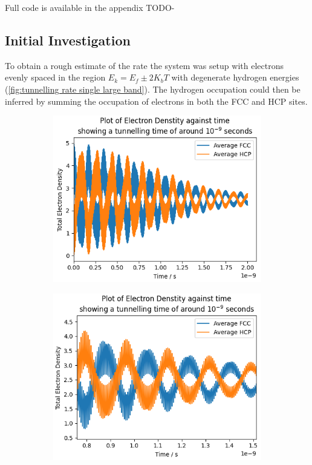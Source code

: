 Full code is available in the appendix TODO-

\subsection{Initial Investigation}
To obtain a rough estimate of
the rate the system was setup
with electrons evenly spaced
in the region \(E_k = E_f \pm 2K_b T\)
with degenerate hydrogen energies (\cref{fig:tunnelling rate single large band}).
The hydrogen occupation
could then be inferred by
summing the occupation
of electrons in both the FCC and
HCP sites.
\begin{figure}[htbp]
    \centering
    \begin{subfigure}{0.45\linewidth}
        \includegraphics[width=0.9\linewidth]{Figures/Simulation/Plot of large band simulation decay times.png}
        \label{fig:large band degenerate simulation}
    \end{subfigure}
    \hfill
    \begin{subfigure}{0.45\linewidth}
        \includegraphics[width=0.9\linewidth]{Figures/Simulation/Plot of large band simulation decay times rapid oscillations.png }

\end{subfigure}
\end{figure}

